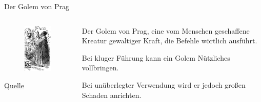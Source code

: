 \documentclass[
  ngerman,
  ignorenonframetext,
]{beamer}
\begin{document}
\begin{frame}{Der Golem von Prag}
\protect\hypertarget{der-golem-von-prag}{}
\begin{columns}[T]
\begin{column}{0.5\textwidth}
\begin{figure}[H]
\includegraphics[width=0.5\linewidth]{img/170px-Golem_and_Loew} \end{figure}

\href{https://de.wikipedia.org/wiki/Golem}{Quelle}
\end{column}

\begin{column}{0.5\textwidth}
Der Golem von Prag, eine vom Menschen geschaffene Kreatur gewaltiger
Kraft, die Befehle wörtlich ausführt.

Bei kluger Führung kann ein Golem Nützliches vollbringen.

Bei unüberlegter Verwendung wird er jedoch großen Schaden anrichten.
\end{column}
\end{columns}
\end{frame}
\end{document}
